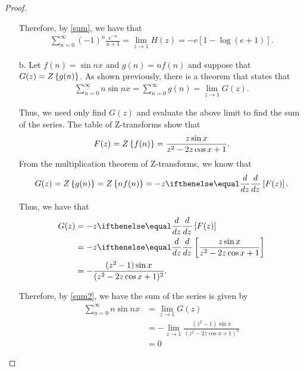 \begin{proof}
\begin{enumerate}
      Therefore, by \eqref{sum}, we have that
      \begin{align*}
        \sum_{n=0}^\infty (-1)^n \frac{e^{-n}}{n+1} = \lim_{z\to 1} H(z) = -e\left[1 - \log \left(e + 1\right)\right].
      \end{align*}

    \item[b.] Let $f(n) = \sin nx$ and $g(n) = n f(n)$ and suppose that $G(z) = Z\left\{ {g(n)} \right\}$. As shown previously,
      there is a theorem that states that
      \begin{align}
        \label{sum2}
        \sum_{n=0}^\infty n \sin nx = \sum_{n=0}^\infty g(n) = \lim_{z\to 1} G(z).
      \end{align}

      Thus, we need only find $G(z)$ and evaluate the above limit
      to find the sum of the series.
      The table of Z-transforms show that
      \begin{align*}
        F(z) = Z\left\{ {f(n)} \right\} = \frac{z \sin x}{z^2 - 2z \cos x + 1}.
      \end{align*}
      From the multiplication theorem of Z-transforms, we know that
      \begin{align*}
        G(z) = \Z{g(n)} = \Z{n f(n)} = -z \der{z}{}\left[F(z)\right].
      \end{align*}

      Thus, we have that
      \begin{align*}
        G(z)
        &= -z \der{z}{}\left[F(z)\right] \\
        &= -z \der{z}{}\left[\frac{z \sin x}{z^2 - 2z \cos x + 1}\right] \\
        &= -\frac{(z^2-1) \sin x}{(z^2 - 2 z \cos x + 1)^2}.
      \end{align*}

      Therefore, by \eqref{sum2}, we have the sum of the series is given by
      \begin{align*}
        \sum_{n=0}^\infty n \sin nx &= \lim_{z\to 1} G(z) \\
        &= -\lim_{z\to 1}\frac{(z^2-1) \sin x}{(z^2 - 2 z \cos x + 1)^2} \\
        &= 0
      \end{align*}
  \end{enumerate}
\end{proof}
\newpage
